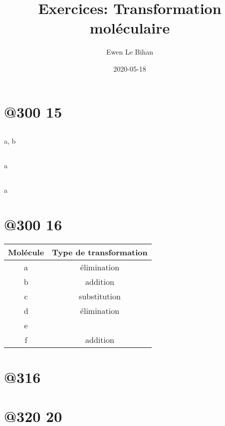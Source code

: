 \documentclass{article}
\title{Exercices: Transformation moléculaire}
\date{2020-05-18}
\author{Ewen Le Bihan}
\begin{document}
\maketitle

\section{@300 15}

\subsection{} a, b
\subsection{} a
\subsection{} a

\section{@300 16}

\begin{table}[h]
	\centering
	\begin{tabular}{c|c}
		Molécule & Type de transformation \\\hline
		a & élimination \\
		b & addition \\
		c & substitution \\
		d & élimination \\
		e & \\
		f & addition \\
	\end{tabular}
\end{table}

\section{@316 }

\newpage
\section{@320 20}
\end{document}
